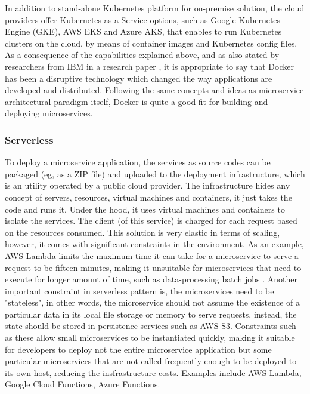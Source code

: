 \documentclass{Configuration_Files/PoliMi3i_thesis}
\begin{document}
In addition to stand-alone Kubernetes platform for on-premise solution, the cloud providers offer Kubernetes-as-a-Service options, such as Google Kubernetes Engine (GKE), AWS EKS and Azure AKS, that enables to run Kubernetes clusters on the cloud, by means of container images and Kubernetes config files.
\\
As a consequence of the capabilities explained above, and as also stated by researchers from IBM in a research paper \cite{jaramillo2016leveraging}, it is appropriate to say that Docker has been a disruptive technology which changed the way applications are developed and distributed.
Following the same concepts and ideas as microservice architectural paradigm itself, Docker is quite a good fit for building and deploying microservices.

\subsubsection{Serverless}
\label{subsubsec:serverless}

To deploy a microservice application, the services as source codes can be packaged (eg, as a ZIP file) and uploaded to the deployment infrastructure, which is an utility operated by a public cloud provider.
The infrastructure hides any concept of servers, resources, virtual machines and containers, it just takes the code and runs it.
Under the hood, it uses virtual machines and containers to isolate the services.
The client (of this service) is charged for each request based on the resources consumed.
This solution is very elastic in terms of scaling, however, it comes with significant constraints in the environment.
As an example, AWS Lambda limits the maximum time it can take for a microservice to serve a request to be fifteen minutes, making it unsuitable for microservices that need to execute for longer amount of time, such as data-processing batch jobs \cite{aws_lambda}.
Another important constraint in serverless pattern is, the microservices need to be "stateless", in other words, the microservice should not assume the existence of a particular data in its local file storage or memory to serve requests, instead, the state should be stored in persistence services such as AWS S3.
Constraints such as these allow small microservices to be instantiated quickly, making it suitable for developers to deploy not the entire microservice application but some particular microservices that are not called frequently enough to be deployed to its own host, reducing the insfrastructure costs.
Examples include AWS Lambda, Google Cloud Functions, Azure Functions.
\end{document}
